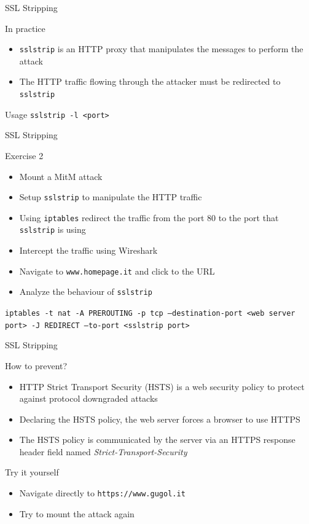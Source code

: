 \documentclass{beamer}
\begin{document}
\begin{frame}{SSL Stripping}
  \begin{block}{In practice}
    \begin{itemize}
      \item \texttt{sslstrip} is an HTTP proxy that manipulates the messages to perform the attack
      \item The HTTP traffic flowing through the attacker must be redirected to \texttt{sslstrip}
    \end{itemize}
  \end{block}
  \begin{block}{Usage}
  \texttt{sslstrip -l <port>}
  \end{block}
\end{frame}
\begin{frame}{SSL Stripping}
  \begin{block}{Exercise 2}
    \begin{itemize}
      \item Mount a MitM attack
      \item Setup \texttt{sslstrip} to manipulate the HTTP traffic
      \item Using \texttt{iptables} redirect the traffic from the port 80 to the port that \texttt{sslstrip} is using
      \item Intercept the traffic using Wireshark
      \item Navigate to \texttt{www.homepage.it} and click to the URL
      \item Analyze the behaviour of \texttt{sslstrip}
    \end{itemize}
  \end{block}
  \pause
  \texttt{iptables -t nat -A PREROUTING -p tcp --destination-port <web server port> -J REDIRECT --to-port <sslstrip port>}

\end{frame}
\begin{frame}{SSL Stripping}
  \begin{block}{How to prevent?}
  \pause
  \begin{itemize}
      \item HTTP Strict Transport Security (HSTS) is a web security policy to protect against protocol downgraded attacks
      \item Declaring the HSTS policy, the web server forces a browser to use HTTPS
      \item The HSTS policy is communicated by the server via an HTTPS response header field named \textit{Strict-Transport-Security}
    \end{itemize}
  \end{block}
  \pause
  \begin{block}{Try it yourself}
  \begin{itemize}
      \item Navigate directly to \texttt{https://www.gugol.it}
      \item Try to mount the attack again
    \end{itemize}
  \end{block}
\end{frame}
\end{document}
